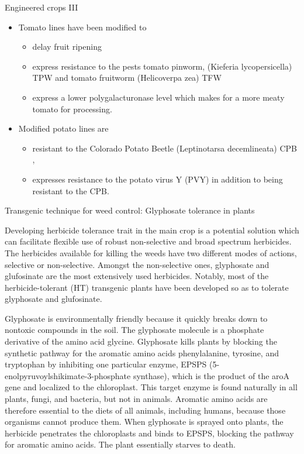 \documentclass[11pt,dvipsnames,ignorenonframetext,aspectratio=169]{beamer}
\providecommand{\tightlist}{%
  \setlength{\itemsep}{0pt}\setlength{\parskip}{0pt}}
\begin{document}
\begin{frame}{Engineered crops III}
\protect\hypertarget{engineered-crops-iii}{}
\begin{itemize}
\tightlist
\item
  Tomato lines have been modified to

  \begin{itemize}
  \tightlist
  \item
    delay fruit ripening
  \item
    express resistance to the pests tomato pinworm, (Kieferia
    lycopersicella) TPW and tomato fruitworm (Helicoverpa zea) TFW
  \item
    express a lower polygalacturonase level which makes for a more meaty
    tomato for processing.
  \end{itemize}
\item
  Modified potato lines are

  \begin{itemize}
  \tightlist
  \item
    resistant to the Colorado Potato Beetle (Leptinotarsa decemlineata)
    CPB ,
  \item
    expresses resistance to the potato virus Y (PVY) in addition to
    being resistant to the CPB.
  \end{itemize}
\end{itemize}
\end{frame}

\begin{frame}{Transgenic technique for weed control: Glyphosate
tolerance in plants}
\protect\hypertarget{transgenic-technique-for-weed-control-glyphosate-tolerance-in-plants}{}
\footnotesize

Developing herbicide tolerance trait in the main crop is a potential
solution which can facilitate flexible use of robust non-selective and
broad spectrum herbicides. The herbicides available for killing the
weeds have two different modes of actions, selective or non-selective.
Amongst the non-selective ones, glyphosate and glufosinate are the most
extensively used herbicides. Notably, most of the herbicide-tolerant
(HT) transgenic plants have been developed so as to tolerate glyphosate
and glufosinate.

Glyphosate is environmentally friendly because it quickly breaks down to
nontoxic compounds in the soil. The glyphosate molecule is a phosphate
derivative of the amino acid glycine. Glyphosate kills plants by
blocking the synthetic pathway for the aromatic amino acids
phenylalanine, tyrosine, and tryptophan by inhibiting one particular
enzyme, EPSPS (5-enolpyruvoylshikimate-3-phosphate synthase), which is
the product of the aroA gene and localized to the chloroplast. This
target enzyme is found naturally in all plants, fungi, and bacteria, but
not in animals. Aromatic amino acids are therefore essential to the
diets of all animals, including humans, because those organisms cannot
produce them. When glyphosate is sprayed onto plants, the herbicide
penetrates the chloroplasts and binds to EPSPS, blocking the pathway for
aromatic amino acids. The plant essentially starves to death.
\end{frame}
\end{document}
